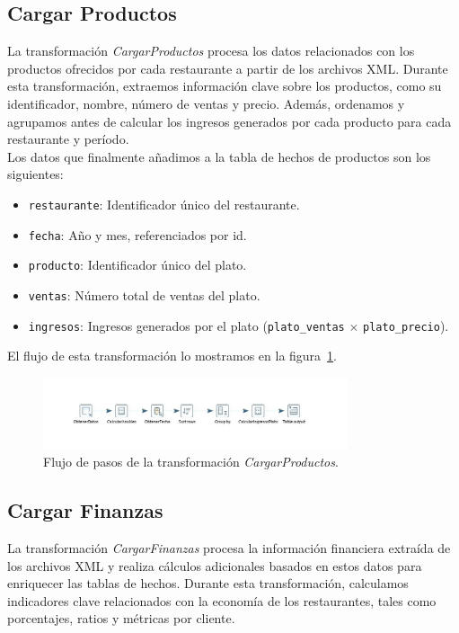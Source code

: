 \documentclass[11pt]{opticajnl}
\begin{document}
\subsection{Cargar Productos}

La transformación \textit{CargarProductos} procesa los datos relacionados con los productos ofrecidos por cada restaurante a partir de los archivos XML. Durante esta transformación, extraemos información clave sobre los productos, como su identificador, nombre, número de ventas y precio. Además, ordenamos y agrupamos antes de calcular los ingresos generados por cada producto para cada restaurante y período. \\

\noindent Los datos que finalmente añadimos a la tabla de hechos de productos son los siguientes:

\begin{itemize}
    \item \texttt{restaurante}: Identificador único del restaurante.
    \item \texttt{fecha}: Año y mes, referenciados por id.
    \item \texttt{producto}: Identificador único del plato.
    \item \texttt{ventas}: Número total de ventas del plato.
    \item \texttt{ingresos}: Ingresos generados por el plato (\texttt{plato\_ventas} $\times$ \texttt{plato\_precio}).
\end{itemize}

\noindent El flujo de esta transformación lo mostramos en la figura~\ref{fig:etl_productos}.

\begin{figure}[h]
    \centering
    \includegraphics[width=0.8\textwidth]{fotos/cargarproducto.jpg}
    \caption{Flujo de pasos de la transformación \textit{CargarProductos}.}
    \label{fig:etl_productos}
\end{figure}

\subsection{Cargar Finanzas}

La transformación \textit{CargarFinanzas} procesa la información financiera extraída de los archivos XML y realiza cálculos adicionales basados en estos datos para enriquecer las tablas de hechos. Durante esta transformación, calculamos indicadores clave relacionados con la economía de los restaurantes, tales como porcentajes, ratios y métricas por cliente. \\
\end{document}
